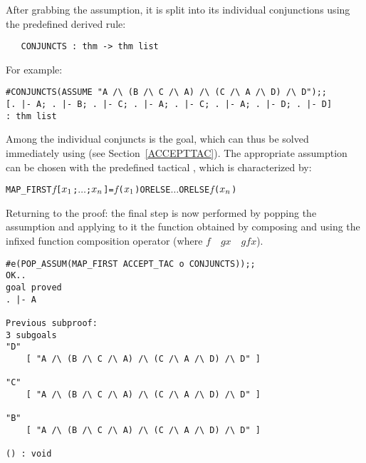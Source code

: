 After grabbing the assumption, it is split into its individual conjunctions
using the predefined derived rule:

\begin{hol}\begin{verbatim}
   CONJUNCTS : thm -> thm list
\end{verbatim}\end{hol}

\noindent For example:


\begin{session}\begin{verbatim}
#CONJUNCTS(ASSUME "A /\ (B /\ C /\ A) /\ (C /\ A /\ D) /\ D");;
[. |- A; . |- B; . |- C; . |- A; . |- C; . |- A; . |- D; . |- D]
: thm list
\end{verbatim}\end{session}

\noindent Among the individual conjuncts is the goal, which can thus be
solved immediately using  (see Section~\ref{ACCEPTTAC}).
The appropriate assumption can be chosen with the predefined tactical
, which
is characterized by:

\begin{hol}\begin{alltt}
   MAP_FIRST \(f\) [\(x\sb{1}\); \(\ldots\) ;\(x\sb{n}\)]  =  \(f\)(\(x\sb{1}\)) ORELSE \(\ldots\) ORELSE \(f\)(\(x\sb{n}\))
\end{alltt}\end{hol}

\noindent Returning to the proof: the final step is now performed by
popping the assumption and applying to it the function obtained by
composing  and  using the \ML{} infixed
function composition operator  
(where \ml{(}$f$~~$g$\ml{)}$x$~\ml{=}~$g$\ml{(}$f$\ml{(}$x$\ml{))}).

\begin{session}\begin{verbatim}
#e(POP_ASSUM(MAP_FIRST ACCEPT_TAC o CONJUNCTS));;
OK..
goal proved
. |- A

Previous subproof:
3 subgoals
"D"
    [ "A /\ (B /\ C /\ A) /\ (C /\ A /\ D) /\ D" ]

"C"
    [ "A /\ (B /\ C /\ A) /\ (C /\ A /\ D) /\ D" ]

"B"
    [ "A /\ (B /\ C /\ A) /\ (C /\ A /\ D) /\ D" ]

() : void
\end{verbatim}\end{session}


